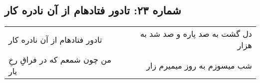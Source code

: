 \begin{center}
\section*{شماره ۲۳: تادور فتادهام از آن نادره کار}
\label{sec:023}
\begin{longtable}{l p{0.5cm} r}
تادور فتادهام از آن نادره کار
&&
دل گشت به صد پاره و صد شد به هزار
\\
من چون شمعم که در فراقِ رخِ یار
&&
شب میسوزم به روز میمیرم زار
\\
\end{longtable}
\end{center}
